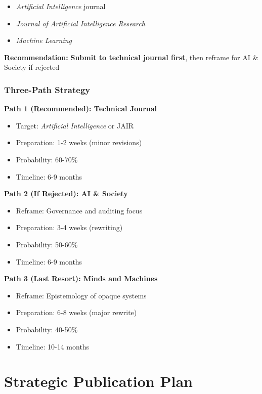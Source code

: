 \documentclass[12pt]{article}
\begin{document}
\begin{itemize}[leftmargin=*]
\item \textit{Artificial Intelligence} journal
\item \textit{Journal of Artificial Intelligence Research}
\item \textit{Machine Learning}
\end{itemize}

\textbf{Recommendation:} \textbf{Submit to technical journal first}, then reframe for AI \& Society if rejected

\subsubsection{Three-Path Strategy}

\textbf{Path 1 (Recommended): Technical Journal}
\begin{itemize}[leftmargin=*]
\item Target: \textit{Artificial Intelligence} or JAIR
\item Preparation: 1-2 weeks (minor revisions)
\item Probability: 60-70\%
\item Timeline: 6-9 months
\end{itemize}

\textbf{Path 2 (If Rejected): AI \& Society}
\begin{itemize}[leftmargin=*]
\item Reframe: Governance and auditing focus
\item Preparation: 3-4 weeks (rewriting)
\item Probability: 50-60\%
\item Timeline: 6-9 months
\end{itemize}

\textbf{Path 3 (Last Resort): Minds and Machines}
\begin{itemize}[leftmargin=*]
\item Reframe: Epistemology of opaque systems
\item Preparation: 6-8 weeks (major rewrite)
\item Probability: 40-50\%
\item Timeline: 10-14 months
\end{itemize}

\section{Strategic Publication Plan}
\end{document}
